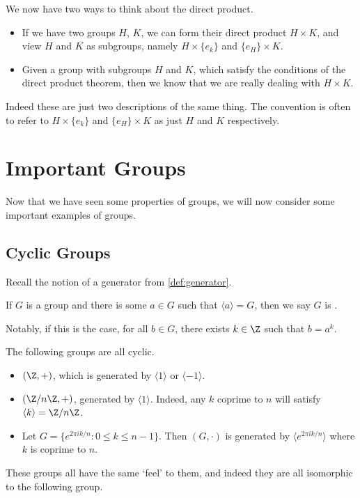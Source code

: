 \documentclass[a4]{scrreprt}
\begin{document}
We now have two ways to think about the direct product. 
\begin{itemize}
	\item If we have two groups $H$, $K$, we can form their direct product $H \times K$, and view $H$ and $K$ as subgroups, namely $H \times \{e_k\}$ and $\{e_H\} \times K$.
	\item Given a group with subgroups $H$ and $K$, which satisfy the conditions of the direct product theorem, then we know that we are really dealing with $H \times K$.
\end{itemize}
Indeed these are just two descriptions of the same thing. The convention is often to refer to $H \times \{e_k\}$ and $\{e_H\} \times K$ as just $H$ and $K$ respectively.

\chapter{Important Groups}

Now that we have seen some properties of groups, we will now consider some important examples of groups.

\section{Cyclic Groups}

Recall the notion of a generator from \autoref{def:generator}.

\begin{definition}[Cyclic]
	If $G$ is a group and there is some $a \in G$ such that $\langle a \rangle = G$, then we say $G$ is . 
\end{definition}
Notably, if this is the case, for all $b \in G$, there exists $k \in \Z$ such that $b = a^k$.

\begin{example}
	The following groups are all cyclic.
	\begin{itemize}
		\item $(\Z, +)$, which is generated by $\langle 1 \rangle$ or $\langle -1 \rangle$.
		\item $(\Z/n\Z, +)$, generated by $\langle 1 \rangle$. Indeed, any $k$ coprime to $n$ will satisfy $\langle k \rangle = \Z/n\Z$.
		\item Let $G = \{ e^{2 \pi i k/n}  : 0 \leq k \leq n - 1 \}$. Then $(G, \cdot)$ is generated by $\langle e^{2 \pi i k/n}\rangle$ where $k$ is coprime to $n$.
	\end{itemize}
\end{example}
These groups all have the same `feel' to them, and indeed they are all isomorphic to the following group.
\end{document}
